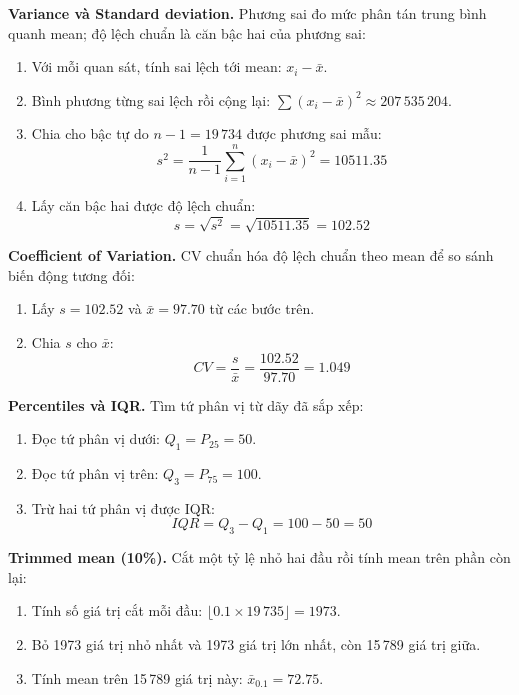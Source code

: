 \noindent\textbf{Variance và Standard deviation.} Phương sai đo mức phân tán trung bình quanh mean; độ lệch chuẩn là căn bậc hai của phương sai:
\begin{enumerate}[leftmargin=2.2em,label=\textbf{\arabic*.}]
 \item Với mỗi quan sát, tính sai lệch tới mean: $x_i-\bar{x}$.
 \item Bình phương từng sai lệch rồi cộng lại: $\sum(x_i-\bar{x})^2 \approx 207\,535\,204$.
 \item Chia cho bậc tự do $n-1=19\,734$ được phương sai mẫu:
 \begin{equation}
 s^2 = \frac{1}{n-1}\sum_{i=1}^{n}(x_i-\bar{x})^2 = 10511.35
 \end{equation}
 \item Lấy căn bậc hai được độ lệch chuẩn:
 \begin{equation}
 s = \sqrt{s^2}=\sqrt{10511.35}=102.52
 \end{equation}
\end{enumerate}

\noindent\textbf{Coefficient of Variation.} CV chuẩn hóa độ lệch chuẩn theo mean để so sánh biến động tương đối:
\begin{enumerate}[leftmargin=2.2em,label=\textbf{\arabic*.}]
 \item Lấy $s=102.52$ và $\bar{x}=97.70$ từ các bước trên.
 \item Chia $s$ cho $\bar{x}$:
 \begin{equation}
 CV = \frac{s}{\bar{x}}=\frac{102.52}{97.70}=1.049
 \end{equation}
\end{enumerate}

\noindent\textbf{Percentiles và IQR.} Tìm tứ phân vị từ dãy đã sắp xếp:
\begin{enumerate}[leftmargin=2.2em,label=\textbf{\arabic*.}]
 \item Đọc tứ phân vị dưới: $Q_1=P_{25}=50$.
 \item Đọc tứ phân vị trên: $Q_3=P_{75}=100$.
 \item Trừ hai tứ phân vị được IQR:
 \begin{equation}
 IQR = Q_3-Q_1 = 100-50 = 50
 \end{equation}
\end{enumerate}

\noindent\textbf{Trimmed mean (10\%).} Cắt một tỷ lệ nhỏ hai đầu rồi tính mean trên phần còn lại:
\begin{enumerate}[leftmargin=2.2em,label=\textbf{\arabic*.}]
 \item Tính số giá trị cắt mỗi đầu: $\lfloor 0.1\times19\,735\rfloor=1973$.
 \item Bỏ 1973 giá trị nhỏ nhất và 1973 giá trị lớn nhất, còn 15\,789 giá trị giữa.
 \item Tính mean trên 15\,789 giá trị này: $\bar{x}_{0.1}=72.75$.
\end{enumerate}

